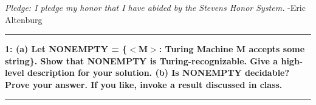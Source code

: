 \documentclass[11pt]{article}
\newcommand\question[2]{\vspace{.25in}\hrule\textbf{#1: #2}\vspace{.5em}\hrule\vspace{.10in}}
\begin{document}
\raggedright
\newcommand\NAME{Eric Altenburg}  %
\newcommand\COURSE{CS-334}
\newcommand\HWNUM{8}              %


\textit{Pledge: I pledge my honor that I have abided by the Stevens Honor System.} -Eric Altenburg

\question{1}{(a) Let NONEMPTY = \{$<$M$>$: Turing Machine M accepts some string\}. Show that NONEMPTY is Turing-recognizable. Give a high-level description for your solution. (b) Is NONEMPTY decidable? Prove your answer. If you like, invoke a result discussed in class.}
\end{document}
